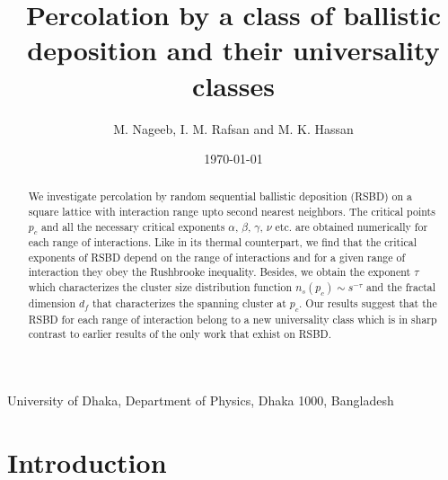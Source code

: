 \documentclass[twocolumn,showpacs,preprintnumbers,amsmath,amssymb]{article}
\begin{document}
\title{Percolation by a class of ballistic deposition and their universality classes 
}%

\author{M. Nageeb, I. M. Rafsan and M. K. Hassan}%
\date{\today}%

University of Dhaka, Department of Physics, Dhaka 1000, Bangladesh \\

\begin{abstract}
We investigate percolation by random sequential ballistic deposition (RSBD) on a square lattice 
with interaction range upto second nearest neighbors. The critical points $p_c$ and 
all the necessary critical exponents $\alpha$, $\beta$, $\gamma$, $\nu$ etc. are obtained numerically for 
each range of interactions. Like  in its thermal counterpart, we find that the critical exponents 
of RSBD depend on the range of interactions and for a given range of interaction they obey the Rushbrooke inequality. 
Besides, we obtain the exponent $\tau$ which characterizes the cluster size distribution  
function $n_s(p_c)\sim s^{-\tau}$ and the fractal dimension $d_f$ that characterizes 
the spanning cluster at $p_c$. Our results suggest that the RSBD for each range of interaction
belong to a new universality class which is in sharp contrast to earlier results of the only work that exhist 
on RSBD.
\end{abstract}


\maketitle

\section{Introduction}
\end{document}
